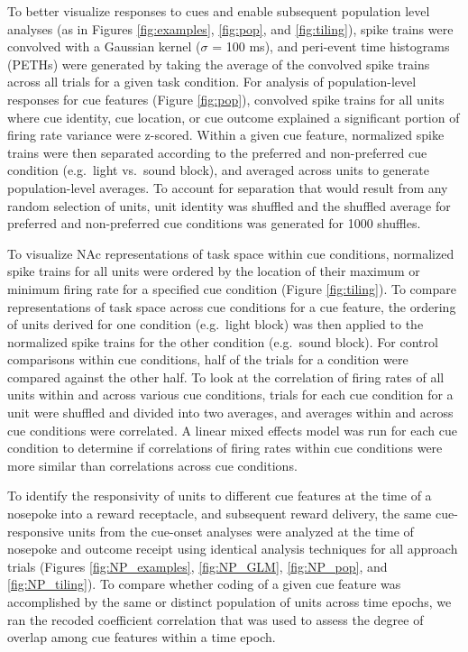 \documentclass[11pt]{article}
\begin{document}
{To better visualize responses to cues and enable subsequent population
level analyses (as in Figures \ref{fig:examples}, \ref{fig:pop}, and
\ref{fig:tiling}), spike trains were convolved with a Gaussian kernel
($\sigma$ = 100 ms), and peri-event time histograms (PETHs) were
generated by taking the average of the convolved spike trains across all
trials for a given task condition. For analysis of population-level
responses for cue features (Figure \ref{fig:pop}), convolved spike
trains for all units where cue identity, cue location, or cue outcome
explained a significant portion of firing rate variance were
z-scored. Within a given cue feature, normalized spike trains were
then separated according to the preferred and non-preferred cue
condition (e.g.\ light vs.\ sound block), and averaged across units to
generate population-level averages. To account for separation that
would result from any random selection of units, unit identity was
shuffled and the shuffled average for preferred and non-preferred cue
conditions was generated for 1000 shuffles.

To visualize NAc representations of task space within cue conditions,
normalized spike trains for all units were ordered by the location of
their maximum or minimum firing rate for a specified cue condition
(Figure \ref{fig:tiling}). To compare representations of task space
across cue conditions for a cue feature, the ordering of units derived
for one condition (e.g.\ light block) was then applied to the
normalized spike trains for the other condition (e.g.\ sound
block). For control comparisons within cue conditions, half of the
trials for a condition were compared against the other half. To look
at the correlation of firing rates of all units within and across
various cue conditions, trials for each cue condition for a unit were
shuffled and divided into two averages, and averages within and across
cue conditions were correlated. A linear mixed effects model was run
for each cue condition to determine if correlations of firing rates
within cue conditions were more similar than correlations across cue
conditions.

To identify the responsivity of units to different cue features at the time of a nosepoke into a reward receptacle, and subsequent reward delivery, the same cue-responsive units from the cue-onset analyses were analyzed at the time of nosepoke and outcome receipt using identical analysis techniques for all approach trials (Figures \ref{fig:NP_examples}, \ref{fig:NP_GLM}, \ref{fig:NP_pop}, and \ref{fig:NP_tiling}). To compare whether coding of a given cue feature was accomplished by the same or distinct population of units across time epochs, we ran the recoded coefficient correlation that was used to assess the degree of overlap among cue features within a time epoch.

}
\end{document}

